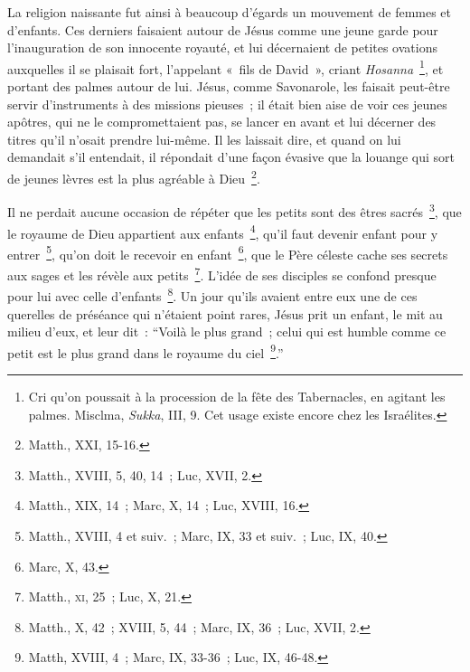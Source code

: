 \documentclass[french,twoside]{book} %
\begin{document}
La religion naissante fut ainsi à beaucoup d’égards un mouvement de femmes et d’enfants. Ces derniers faisaient autour de Jésus comme une jeune garde pour l’inauguration de son innocente royauté, et lui décernaient de petites ovations auxquelles il se plaisait fort, l’appelant « fils de David », criant {\itshape Hosanna} \footnote{ Cri qu’on poussait à la procession de la fête des Tabernacles, en agitant les palmes. Misclma, {\itshape Sukka}, III, 9. Cet usage existe encore chez les Israélites.}, et portant des palmes autour de lui. Jésus, comme Savonarole, les faisait peut-être servir d’instruments à des missions pieuses ; il était bien aise de voir ces jeunes apôtres, qui ne le compromettaient pas, se lancer en avant et lui décerner des titres qu’il n’osait prendre lui-même. Il les laissait dire, et quand on lui demandait s’il entendait, il répondait d’une façon évasive que la louange qui sort de jeunes lèvres est la plus agréable à Dieu \footnote{Matth., XXI, 15-16.}.\par
Il ne perdait aucune occasion de répéter que les petits sont des êtres sacrés \footnote{Matth., XVIII, 5, 40, 14 ; Luc, XVII, 2.}, que le royaume de Dieu appartient aux enfants \footnote{Matth., XIX, 14 ; Marc, X, 14 ; Luc, XVIII, 16.}, qu’il faut devenir enfant pour y entrer \footnote{Matth., XVIII, 4 et suiv. ; Marc, IX, 33 et suiv. ; Luc, IX, 40.}, qu’on doit le recevoir en enfant \footnote{Marc, X, 43.}, que le Père céleste cache ses secrets aux sages et les révèle aux petits \footnote{ Matth., \textsc{xi}, 25 ; Luc, X, 21.}. L’idée de ses disciples se confond presque pour lui avec celle d’enfants \footnote{Matth., X, 42 ; XVIII, 5, 44 ; Marc, IX, 36 ; Luc, XVII, 2.}. Un jour qu’ils avaient entre eux une de ces querelles de préséance qui n’étaient point rares, Jésus prit un enfant, le mit au milieu d’eux, et leur dit : “Voilà le plus grand ; celui qui est humble comme ce petit est le plus grand dans le royaume du ciel \footnote{Matth, XVIII, 4 ; Marc, IX, 33-36 ; Luc, IX, 46-48.}.”\par
\end{document}

